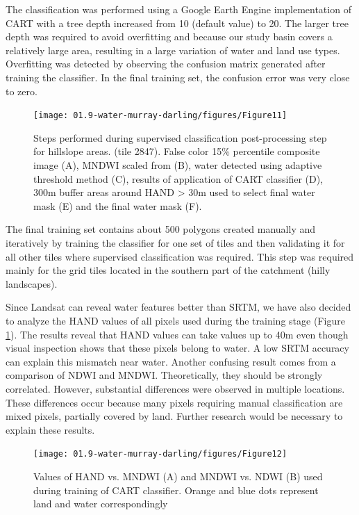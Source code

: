 The classification was performed using a Google Earth Engine implementation of CART with a tree depth increased from 10 (default value) to 20. The larger tree depth was required to avoid overfitting and because our study basin covers a relatively large area, resulting in a large variation of water and land use types. Overfitting was detected by observing the confusion matrix generated after training the classifier. In the final training set, the confusion error was very close to zero. 

\begin{figure}[H]
	\centering
	\texttt{[image: 01.9-water-murray-darling/figures/Figure11]}
	\caption{Steps performed during supervised classification post-processing step for hillslope areas. (tile 2847). False color 15\% percentile composite image (A), MNDWI scaled from (B), water detected using adaptive threshold method (C), results of application of CART classifier (D), 300m buffer areas around HAND > 30m used to select final water mask (E) and the final water mask (F).}
\end{figure}

The final training set contains about 500 polygons created manually and iteratively by training the classifier for one set of tiles and then validating it for all other tiles where supervised classification was required. This step was required mainly for the grid tiles located in the southern part of the catchment (hilly landscapes).

Since Landsat can reveal water features better than SRTM, we have also decided to analyze the HAND values of all pixels used during the training stage (Figure \ref{fig:au-hand-vs-mndwi}). The results reveal that HAND values can take values up to 40m even though visual inspection shows that these pixels belong to water. A low SRTM accuracy can explain this mismatch near water. Another confusing result comes from a comparison of NDWI and MNDWI. Theoretically, they should be strongly correlated. However, substantial differences were observed in multiple locations. These differences occur because many pixels requiring manual classification are mixed pixels, partially covered by land. Further research would be necessary to explain these results.

\begin{figure}[H]
	\centering
	\texttt{[image: 01.9-water-murray-darling/figures/Figure12]}
	\caption{Values of HAND vs. MNDWI (A) and MNDWI vs. NDWI (B) used during training of CART classifier. Orange and blue dots represent land and water correspondingly}
	\label{fig:au-hand-vs-mndwi}
\end{figure}

